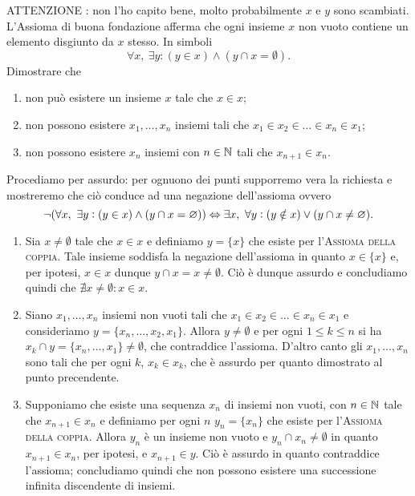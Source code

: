 \begin{es}
  \textsf{ATTENZIONE : non l'ho capito bene, molto probabilmente $ x $ e $ y $ sono scambiati.} \\
  L'Assioma di buona fondazione afferma che ogni insieme $ x $ non vuoto contiene un elemento disgiunto da $ x $ stesso. In simboli \[\forall x, \ \exists y : (y \in x) \wedge (y \cap x = \emptyset).\] Dimostrare che
  \begin{enumerate}
  \item non può esistere un insieme $ x $ tale che $ x \in x $;
  \item non possono esistere $ x_1, \dots, x_n $ insiemi tali che $ x_1 \in x_2 \in \dots \in x_n \in x_1 $;
  \item non possono esistere $ x_n $ insiemi con $ n \in \mathbb{N} $ tali che $ x_{n+1} \in x_{n} $.
  \end{enumerate}
\end{es}
Procediamo per assurdo: per ognuono dei punti supporremo vera la richiesta e mostreremo che ciò conduce ad una negazione dell'assioma ovvero \[\neg (\forall x, \ \exists y : (y \in x) \wedge (y \cap x = \varnothing)) \Leftrightarrow \exists x, \ \forall y : (y \notin x) \vee (y \cap x \neq \varnothing). \]
\begin{enumerate}
\item Sia $ x \neq \emptyset $ tale che $ x \in x $ e definiamo $ y = \{x\} $ che esiste per l'\textsc{Assioma della coppia}. Tale insieme soddisfa la negazione dell'assioma in quanto $ x \in \{x\} $ e, per ipotesi, $ x \in x $ dunque $ y \cap x = x \neq \emptyset $. Ciò è dunque assurdo e concludiamo quindi che $ \nexists x \neq \emptyset : x \in x $.
\item Siano $ x_1, \dots, x_n $ insiemi non vuoti tali che $ x_1 \in x_2 \in \dots \in x_n \in x_1 $ e consideriamo  $ y = \{x_n, \dots, x_2, x_1\} $. Allora $ y \neq \emptyset $ e per ogni $ 1 \leq k \leq n $ si ha $ x_k \cap y = \{x_n, \dots, x_1\} \neq \emptyset $, che contraddice l'assioma. D'altro canto gli $ x_1, \dots, x_n $ sono tali che per ogni $ k $, $ x_k \in x_k $, che è assurdo per quanto dimostrato al punto precendente.
\item Supponiamo che esiste una sequenza $ x_n $ di insiemi non vuoti, con $ n \in \mathbb{N} $ tale che $ x_{n+1} \in x_n $ e definiamo per ogni $ n $ $ y_n = \{x_n\} $ che esiste per l'\textsc{Assioma della coppia}. Allora $ y_n $ è un insieme non vuoto e $ y_n \cap x_n \neq \emptyset $ in quanto $ x_{n+1} \in x_n $, per ipotesi, e $ x_{n+1} \in y $. Ciò è assurdo in quanto contraddice l'assioma; concludiamo quindi che non possono esistere una successione infinita discendente di insiemi.
\end{enumerate}